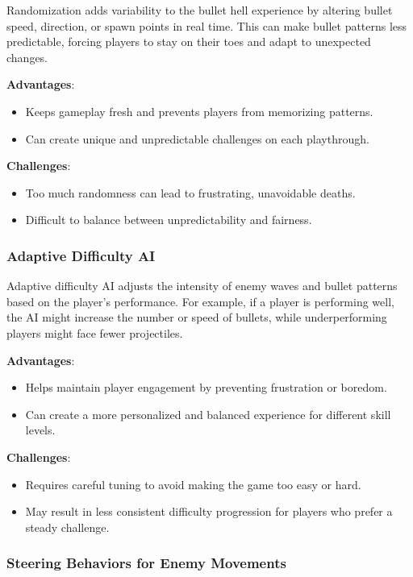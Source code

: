 Randomization adds variability to the bullet hell experience by altering bullet speed, direction, or spawn points in real time. This can make bullet patterns less predictable, forcing players to stay on their toes and adapt to unexpected changes.

\textbf{Advantages}:
\begin{itemize}
    \item Keeps gameplay fresh and prevents players from memorizing patterns.
    \item Can create unique and unpredictable challenges on each playthrough.
\end{itemize}

\textbf{Challenges}:
\begin{itemize}
    \item Too much randomness can lead to frustrating, unavoidable deaths.
    \item Difficult to balance between unpredictability and fairness.
\end{itemize}

\subsubsection{Adaptive Difficulty AI}

Adaptive difficulty AI adjusts the intensity of enemy waves and bullet patterns based on the player’s performance. For example, if a player is performing well, the AI might increase the number or speed of bullets, while underperforming players might face fewer projectiles.

\textbf{Advantages}:
\begin{itemize}
    \item Helps maintain player engagement by preventing frustration or boredom.
    \item Can create a more personalized and balanced experience for different skill levels.
\end{itemize}

\textbf{Challenges}:
\begin{itemize}
    \item Requires careful tuning to avoid making the game too easy or hard.
    \item May result in less consistent difficulty progression for players who prefer a steady challenge.
\end{itemize}

\subsubsection{Steering Behaviors for Enemy Movements}

